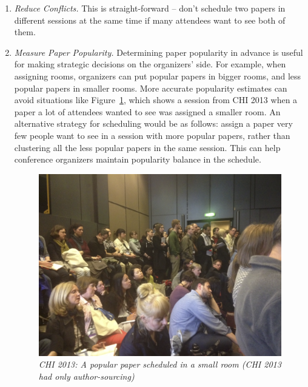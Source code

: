 \documentclass[letterpaper]{article}
\begin{document}
\begin{enumerate}
\begin{enumerate}
\item \emph{Reduce Conflicts.} This is straight-forward -- don't schedule two papers in different sessions at the same time if many attendees want to see both of them. 

\item \emph{Measure Paper Popularity.} Determining paper popularity in advance is useful for making strategic decisions on the organizers' side. For example, when assigning rooms, organizers can put popular papers in bigger rooms, and less popular papers in smaller rooms. More accurate popularity estimates can avoid situations like Figure~\ref{crowded-room}, which shows a session from CHI 2013 when a paper a lot of attendees wanted to see was assigned a smaller room. An alternative strategy for scheduling would be as follows: assign a paper very few people want to see in a session with more popular papers, rather than clustering all the less popular papers in the same session. This can help conference organizers maintain popularity balance in the schedule.
\\

\begin{figure}[!h]
\centering
\includegraphics[width=0.9\columnwidth]{crowded-room.png}
\caption{\emph{CHI 2013: A popular paper scheduled in a small room (CHI 2013 had only author-sourcing)}}
\label{crowded-room}
\end{figure}
\end{enumerate}
\end{enumerate}
\end{document}
